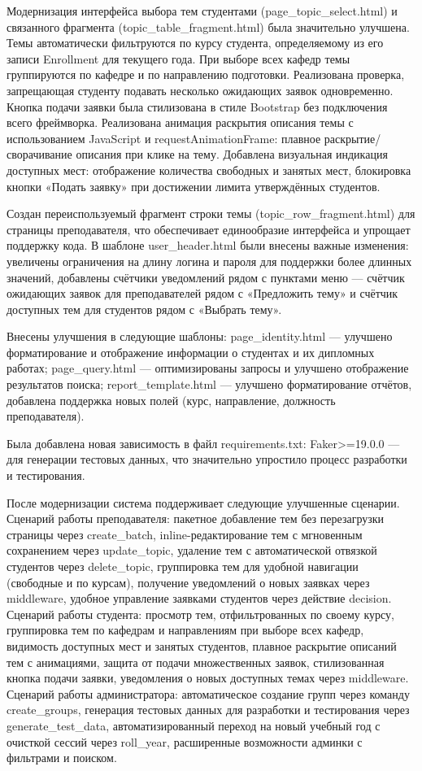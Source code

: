 \documentclass[a4paper,12pt]{article}
\begin{document}
Модернизация интерфейса выбора тем студентами (page\_topic\_select.html) и связанного фрагмента (topic\_table\_fragment.html) была значительно улучшена. Темы автоматически фильтруются по курсу студента, определяемому из его записи Enrollment для текущего года. При выборе всех кафедр темы группируются по кафедре и по направлению подготовки. Реализована проверка, запрещающая студенту подавать несколько ожидающих заявок одновременно. Кнопка подачи заявки была стилизована в стиле Bootstrap без подключения всего фреймворка. Реализована анимация раскрытия описания темы с использованием JavaScript и requestAnimationFrame: плавное раскрытие/сворачивание описания при клике на тему. Добавлена визуальная индикация доступных мест: отображение количества свободных и занятых мест, блокировка кнопки «Подать заявку» при достижении лимита утверждённых студентов.

Создан переиспользуемый фрагмент строки темы (topic\_row\_fragment.html) для страницы преподавателя, что обеспечивает единообразие интерфейса и упрощает поддержку кода. В шаблоне user\_header.html были внесены важные изменения: увеличены ограничения на длину логина и пароля для поддержки более длинных значений, добавлены счётчики уведомлений рядом с пунктами меню — счётчик ожидающих заявок для преподавателей рядом с «Предложить тему» и счётчик доступных тем для студентов рядом с «Выбрать тему».

Внесены улучшения в следующие шаблоны: page\_identity.html — улучшено форматирование и отображение информации о студентах и их дипломных работах; page\_query.html — оптимизированы запросы и улучшено отображение результатов поиска; report\_template.html — улучшено форматирование отчётов, добавлена поддержка новых полей (курс, направление, должность преподавателя).

Была добавлена новая зависимость в файл requirements.txt: Faker>=19.0.0 — для генерации тестовых данных, что значительно упростило процесс разработки и тестирования.

После модернизации система поддерживает следующие улучшенные сценарии. Сценарий работы преподавателя: пакетное добавление тем без перезагрузки страницы через create\_batch, inline-редактирование тем с мгновенным сохранением через update\_topic, удаление тем с автоматической отвязкой студентов через delete\_topic, группировка тем для удобной навигации (свободные и по курсам), получение уведомлений о новых заявках через middleware, удобное управление заявками студентов через действие decision. Сценарий работы студента: просмотр тем, отфильтрованных по своему курсу, группировка тем по кафедрам и направлениям при выборе всех кафедр, видимость доступных мест и занятых студентов, плавное раскрытие описаний тем с анимациями, защита от подачи множественных заявок, стилизованная кнопка подачи заявки, уведомления о новых доступных темах через middleware. Сценарий работы администратора: автоматическое создание групп через команду create\_groups, генерация тестовых данных для разработки и тестирования через generate\_test\_data, автоматизированный переход на новый учебный год с очисткой сессий через roll\_year, расширенные возможности админки с фильтрами и поиском.
\end{document}
